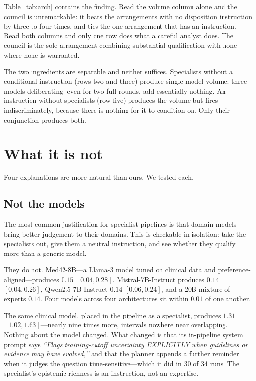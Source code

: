 \documentclass[11pt]{article}
\begin{document}
Table~\ref{tab:arch} contains the finding. Read the volume column alone and
the council is unremarkable: it beats the arrangements with no disposition
instruction by three to four times, and ties the one arrangement that has an
instruction. Read both columns and only one row does what a careful analyst
does. The council is the sole arrangement combining substantial qualification
with none where none is warranted.

The two ingredients are separable and neither suffices. Specialists without a
conditional instruction (rows two and three) produce single-model volume:
three models deliberating, even for two full rounds, add essentially nothing.
An instruction without specialists (row five) produces the volume but fires
indiscriminately, because there is nothing for it to condition on. Only their
conjunction produces both.

\section{What it is not}
\label{sec:not}
Four explanations are more natural than ours. We tested each.

\subsection{Not the models}
The most common justification for specialist pipelines is that domain models
bring better judgement to their domains. This is checkable in isolation: take
the specialists out, give them a neutral instruction, and see whether they
qualify more than a generic model.

They do not. Med42-8B---a Llama-3 model tuned on clinical data and
preference-aligned---produces $0.15$ $[0.04,0.28]$. Mistral-7B-Instruct
produces $0.14$ $[0.04,0.26]$, Qwen2.5-7B-Instruct $0.14$ $[0.06,0.24]$, and a
20B mixture-of-experts $0.14$. Four models across four architectures sit
within $0.01$ of one another.

The same clinical model, placed in the pipeline as a specialist, produces
$1.31$ $[1.02,1.63]$---nearly nine times more, intervals nowhere near
overlapping. Nothing about the model changed. What changed is that its
in-pipeline system prompt says \emph{``Flags training-cutoff uncertainty
EXPLICITLY when guidelines or evidence may have evolved,''} and that the
planner appends a further reminder when it judges the question
time-sensitive---which it did in 30 of 34 runs. The specialist's epistemic
richness is an instruction, not an expertise.
\end{document}
